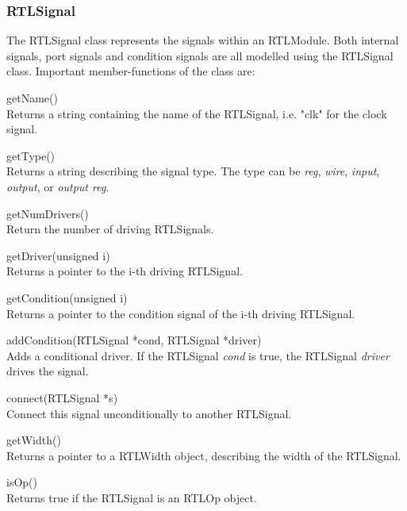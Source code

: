 \subsubsection{RTLSignal}
The RTLSignal class represents the signals within an RTLModule. Both internal signals, port signals and condition signals are all modelled using the RTLSignal class. Important member-functions of the class are:
\begin{compactdesc}
    \item[getName()] \hfill \\
    Returns a string containing the name of the RTLSignal, i.e. "clk" for the clock signal.
    \item[getType()] \hfill \\
    Returns a string describing the signal type. The type can be \textit{reg}, \textit{wire}, \textit{input}, \textit{output}, or \textit{output reg}.
    \item[getNumDrivers()] \hfill \\
    Return the number of driving RTLSignals. 
    \item[getDriver(unsigned i)] \hfill \\
    Returns a pointer to the i-th driving RTLSignal.
    \item[getCondition(unsigned i)] \hfill \\
    Returns a pointer to the condition signal of the i-th driving RTLSignal.
    \item[addCondition(RTLSignal *cond, RTLSignal *driver)] \hfill \\
    Adds a conditional driver. If the RTLSignal \textit{cond} is true, the RTLSignal \textit{driver} drives the signal. 
    \item[connect(RTLSignal *s)] \hfill \\
    Connect this signal unconditionally to another RTLSignal.
    \item[getWidth()] \hfill \\
    Returns a pointer to a RTLWidth object, describing the width of the RTLSignal.
    \item[isOp()] \hfill \\
    Returns true if the RTLSignal is an RTLOp object.
\end{compactdesc}
